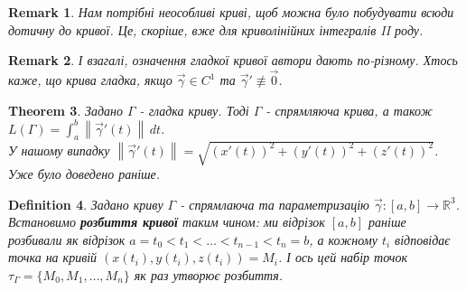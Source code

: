 \documentclass[a4paper, 10pt]{article}
\def\huge{\displaystyle}
\theoremstyle{theoremdd}
\newtheorem{theorem}{Theorem}[subsection]
\theoremstyle{theoremdd}
\newtheorem{definition}[theorem]{Definition}
\theoremstyle{theoremdd}
\theoremstyle{theoremdd}
\theoremstyle{theoremdd}
\theoremstyle{theoremdd}
\newtheorem{remark}[theorem]{Remark}
\theoremstyle{theoremdd}
\theoremstyle{theoremdd}
\newcommand\Norm[1]{\left\lVert#1\right\rVert}
\begin{document}
\begin{remark}
Нам потрібні неособливі криві, щоб можна було побудувати всюди дотичну до кривої. Це, скоріше, вже для криволінійних інтегралів II роду.
\end{remark}

\begin{remark}
І взагалі, означення гладкої кривої автори дають по-різному. Хтось каже, що крива гладка, якщо $\vec{\gamma} \in C^1$ та $\vec{\gamma}' \not\equiv \vec{0}$.
\end{remark}

\begin{theorem}
Задано $\Gamma$ - гладка криву. Тоді $\Gamma$ - спрямляюча крива, а також \\ $L(\Gamma) = \huge\int_a^b \Norm{\vec{\gamma}'(t)}\,dt$.\\
У нашому випадку $\Norm{\vec{\gamma}'(t)} = \sqrt{(x'(t))^2 + (y'(t))^2 + (z'(t))^2}$.\\
\textit{Уже було доведено раніше.}
\end{theorem}

\begin{definition}
Задано криву $\Gamma$ - спрямлаюча та параметризацію $\vec{\gamma}: [a,b] \to \mathbb{R}^3$.\\
Встановимо \textbf{розбиття кривої} таким чином: ми відрізок $[a,b]$ раніше розбивали як відрізок $a = t_0 < t_1 < \dots < t_{n-1} < t_n = b$, а кожному $t_i$ відповідає точка на кривій $(x(t_i),y(t_i),z(t_i)) = M_i$. І ось цей набір точок $\tau_\Gamma = \{M_0,M_1,\dots,M_n\}$ як раз утворює розбиття.
\begin{figure}[H]
\centering
{}
\end{figure}
\end{definition}
\end{document}

